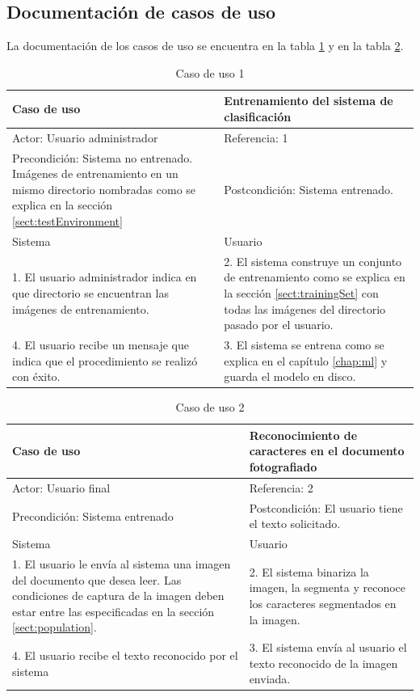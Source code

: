 \documentclass[a4paper, 11pt, oneside]{report}
\begin{document}
\subsection{Documentación de casos de uso}
La documentación de los casos de uso se encuentra en la tabla \ref{tb:uc1} y en la tabla \ref{tb:uc2}.
\begin{table}
\begin{center}
\begin{tabular}{|p{6cm}|p{6cm}|}
\hline
Caso de uso & Entrenamiento del sistema de clasificación\\
\hline
Actor: Usuario administrador & Referencia: 1 \\
\hline
Precondición: Sistema no entrenado. Imágenes de entrenamiento en un mismo directorio nombradas como se explica en la sección \ref{sect:testEnvironment} & 
Postcondición: Sistema entrenado. \\
\hline
Sistema & Usuario \\
\hline
1. El usuario administrador indica en que directorio se encuentran las imágenes de entrenamiento. &
2. El sistema construye un conjunto de entrenamiento como se explica en la sección \ref{sect:trainingSet} con todas las imágenes del directorio pasado por el usuario. \\
\hline
4. El usuario recibe un mensaje que indica que el procedimiento se realizó c\label{eq:hu}on éxito. &
3. El sistema se entrena como se explica en el capítulo \ref{chap:ml} y guarda el modelo en disco. \\
\hline
\end{tabular}
\end{center}
\caption{Caso de uso 1} 
\label{tb:uc1}
\end{table}
\begin{table}
\begin{center}
\begin{tabular}{|p{6cm}|p{6cm}|}
\hline
Caso de uso & Reconocimiento de caracteres en el documento fotografiado\\
\hline
Actor: Usuario final & Referencia: 2 \\
\hline
Precondición: Sistema entrenado & Postcondición: El usuario tiene el texto solicitado. \\
\hline
Sistema & Usuario \\
\hline
1. El usuario le envía al sistema una imagen del documento que desea leer. Las condiciones de captura de la imagen deben estar entre las especificadas en la sección \ref{sect:population}. &
2. El sistema binariza la imagen, la segmenta y reconoce los caracteres segmentados en la imagen. \\
\hline
4. El usuario recibe el texto reconocido por el sistema &
3. El sistema envía al usuario el texto reconocido de la imagen enviada. \\
\hline
\end{tabular}
\end{center}
\caption{Caso de uso 2} 
\label{tb:uc2}
\end{table}
\end{document}

